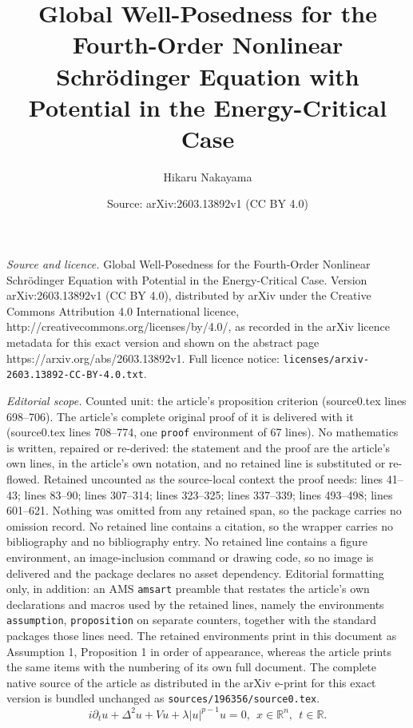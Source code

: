 \documentclass[10pt,a4paper]{amsart}
\title{Global Well-Posedness for the Fourth-Order Nonlinear Schr\"{o}dinger Equation with Potential in the Energy-Critical Case}
\author{Hikaru Nakayama}
\date{Source: arXiv:2603.13892v1 (CC BY 4.0)}
\begin{document}
\maketitle

\noindent\emph{Source and licence.} Global Well-Posedness for the Fourth-Order Nonlinear Schr\"{o}dinger Equation with Potential in the Energy-Critical Case. Version arXiv:2603.13892v1 (CC BY 4.0), distributed by arXiv under the Creative Commons Attribution 4.0 International licence, http://creativecommons.org/licenses/by/4.0/, as recorded in the arXiv licence metadata for this exact version and shown on the abstract page https://arxiv.org/abs/2603.13892v1. Full licence notice: \texttt{licenses/arxiv-2603.13892-CC-BY-4.0.txt}.\par\smallskip

\noindent\textit{Editorial scope.} Counted unit: the article's proposition criterion (source0.tex lines 698--706). The article's complete original proof of it is delivered with it (source0.tex lines 708--774, one \texttt{proof} environment of 67 lines). No mathematics is written, repaired or re-derived: the statement and the proof are the article's own lines, in the article's own notation, and no retained line is substituted or re-flowed.  Retained uncounted as the source-local context the proof needs: lines 41--43; lines 83--90; lines 307--314; lines 323--325; lines 337--339; lines 493--498; lines 601--621.  Nothing was omitted from any retained span, so the package carries no omission record.  No retained line contains a citation, so the wrapper carries no bibliography and no bibliography entry.  No retained line contains a figure environment, an image-inclusion command or drawing code, so no image is delivered and the package declares no asset dependency.  Editorial formatting only, in addition: an AMS \texttt{amsart} preamble that restates the article's own declarations and macros used by the retained lines, namely the environments \texttt{assumption}, \texttt{proposition} on separate counters, together with the standard packages those lines need.  The retained environments print in this document as Assumption 1, Proposition 1 in order of appearance, whereas the article prints the same items with the numbering of its own full document.  The complete native source of the article as distributed in the arXiv e-print for this exact version is bundled unchanged as \texttt{sources/196356/source0.tex}.
\begin{equation}\label{eq:NL4S}
  i\partial_{t}u + \Delta^{2}u + Vu + \lambda|u|^{p-1}u = 0,\ \ x \in \mathbb{R}^{n}, \ \ t \in \mathbb{R}.
\end{equation}
\end{document}
